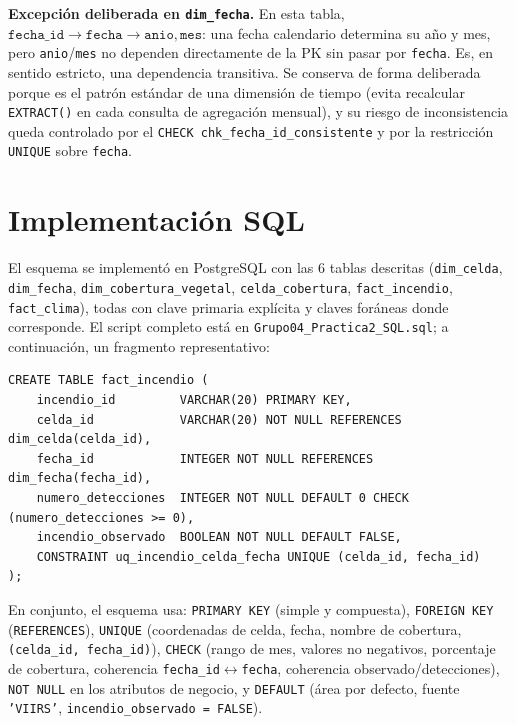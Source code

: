 \documentclass[11pt,a4paper]{article}
\begin{document}
\textbf{Excepci\'on deliberada en \texttt{dim\_fecha}.} En esta tabla,
$\texttt{fecha\_id} \rightarrow \texttt{fecha} \rightarrow \texttt{anio}, \texttt{mes}$: una
fecha calendario determina su a\~no y mes, pero \texttt{anio}/\texttt{mes} no dependen
directamente de la PK sin pasar por \texttt{fecha}. Es, en sentido estricto, una dependencia
transitiva. Se conserva de forma deliberada porque es el patr\'on est\'andar de una dimensi\'on
de tiempo (evita recalcular \texttt{EXTRACT()} en cada consulta de agregaci\'on mensual), y su
riesgo de inconsistencia queda controlado por el \texttt{CHECK chk\_fecha\_id\_consistente} y por
la restricci\'on \texttt{UNIQUE} sobre \texttt{fecha}.

\section{Implementaci\'on SQL}

El esquema se implement\'o en PostgreSQL con las 6 tablas descritas (\texttt{dim\_celda},
\texttt{dim\_fecha}, \texttt{dim\_cobertura\_vegetal}, \texttt{celda\_cobertura},
\texttt{fact\_incendio}, \texttt{fact\_clima}), todas con clave primaria expl\'icita y claves
for\'aneas donde corresponde. El script completo est\'a en
\texttt{Grupo04\_Practica2\_SQL.sql}; a continuaci\'on, un fragmento representativo:

\begin{scriptsize}
\begin{verbatim}
CREATE TABLE fact_incendio (
    incendio_id         VARCHAR(20) PRIMARY KEY,
    celda_id            VARCHAR(20) NOT NULL REFERENCES dim_celda(celda_id),
    fecha_id            INTEGER NOT NULL REFERENCES dim_fecha(fecha_id),
    numero_detecciones  INTEGER NOT NULL DEFAULT 0 CHECK (numero_detecciones >= 0),
    incendio_observado  BOOLEAN NOT NULL DEFAULT FALSE,
    CONSTRAINT uq_incendio_celda_fecha UNIQUE (celda_id, fecha_id)
);
\end{verbatim}
\end{scriptsize}

En conjunto, el esquema usa: \texttt{PRIMARY KEY} (simple y compuesta), \texttt{FOREIGN KEY}
(\texttt{REFERENCES}), \texttt{UNIQUE} (coordenadas de celda, fecha, nombre de cobertura,
\texttt{(celda\_id, fecha\_id)}), \texttt{CHECK} (rango de mes, valores no negativos, porcentaje
de cobertura, coherencia \texttt{fecha\_id}$\leftrightarrow$\texttt{fecha}, coherencia
observado/detecciones), \texttt{NOT NULL} en los atributos de negocio, y \texttt{DEFAULT} (\'area
por defecto, fuente \texttt{'VIIRS'}, \texttt{incendio\_observado = FALSE}).
\end{document}
